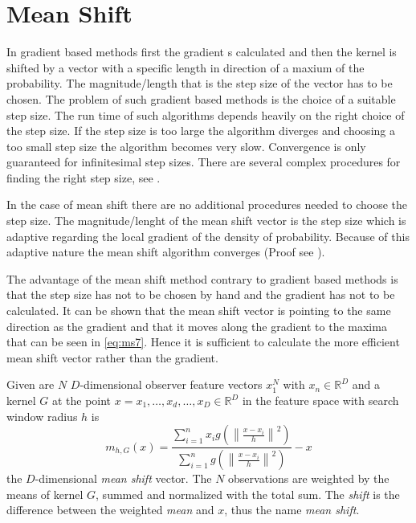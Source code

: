 \section{Mean Shift} %
\label{sec:mean_shift}
In gradient based methods first the gradient s calculated and then the kernel is
shifted by a vector with a specific length in direction of a maxium of the 
probability. The magnitude/length that is the step size of the vector has to be
chosen. The problem of such gradient based methods is the choice of a suitable
step size. The run time of such algorithms depends heavily on the right choice
of the step size. If the step size is too large the algorithm diverges and 
choosing a too small step size the algorithm becomes very slow. Convergence is
only guaranteed for infinitesimal step sizes. There are several complex 
procedures for finding the right step size, see \citeauthor{citeulike:462300} 
\citep{citeulike:462300}.

In the case of mean shift there are no additional procedures needed to choose
the step size. The magnitude/lenght of the mean shift vector is the step size 
which is adaptive regarding the local gradient of the density of probability. 
Because of this adaptive nature the mean shift algorithm converges (Proof see 
\citeauthor{citeulike:462300} \citep{citeulike:462300}).

The advantage of the mean shift method contrary to gradient based methods is
that the step size has not to be chosen by hand and the gradient has not to be
calculated. It can be shown that the mean shift vector is pointing to the same
direction as the gradient and that it moves along the gradient to the maxima 
that can be seen in \autoref{eq:ms7}. Hence it is sufficient to calculate the
more efficient mean shift vector rather than the gradient. 

Given are $N$ $D$-dimensional observer feature vectors $x_1^N$ with $x_n \in
\mathbb{R}^D$ and a kernel $G$ at the point
$x = {x_1, \ldots , x_d, \ldots , x_D} \in \mathbb{R}^D$ in the feature space with 
search window radius $h$ is 
\begin{equation}\label{eq:ms0}
	m_{h,G}(x) = \frac{\sum_{i=1}^n x_i g\left(\left\lVert \frac{x - x_i}{h}
	\right\rVert^2\right)}{\sum_{i=1}^n g\left(\left\lVert \frac{x - x_i}{h}
	\right\rVert^2\right)} -x
\end{equation}
the $D$-dimensional \textit{mean shift} vector. The $N$ observations are
weighted by the means of kernel $G$, summed and normalized with the total sum.
The \emph{shift} is the difference between the weighted \emph{mean} and $x$, thus
the name \emph{mean shift}. 

